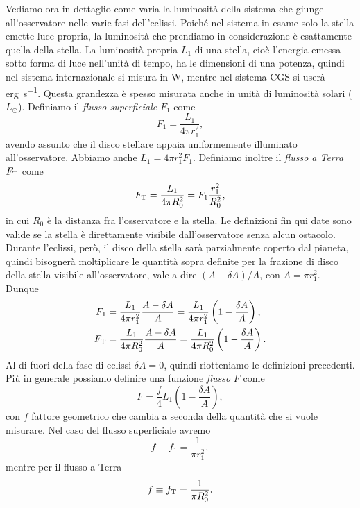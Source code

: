 Vediamo ora in dettaglio come varia la luminosità della sistema che giunge
all'osservatore nelle varie fasi dell'eclissi. Poiché nel sistema in esame solo
la stella emette luce propria, la luminosità che prendiamo in considerazione è
esattamente quella della stella. La luminosità propria $L_1$ di una stella,
cioè l'energia emessa sotto forma di luce nell'unità di tempo, ha le dimensioni
di una potenza, quindi nel sistema internazionale si misura in \si{\watt},
mentre nel sistema CGS si userà \si{erg\per \second}. Questa grandezza è spesso
misurata anche in unità di luminosità solari ($L_\odot$). Definiamo il
\emph{flusso superficiale} $F_1$ come
\begin{equation}
    F_1 = \frac{L_1}{4\pi r_1^2},
\end{equation}
avendo assunto che il disco stellare appaia uniformemente illuminato
all'osservatore. Abbiamo anche $L_1 = 4\pi r_1^2 F_1$. Definiamo
inoltre il \emph{flusso a Terra} $F_{\textup{T}}$ come
\begin{equation}
  F_{\textup{T}} = \frac{L_1}{4\pi R_0^2} = F_1 \frac{r_1^2}{R_0^2},
\end{equation}
in cui $R_0$ è la distanza fra l'osservatore e la stella. Le definizioni fin qui
date sono valide se la stella è direttamente visibile dall'osservatore senza
alcun ostacolo. Durante l'eclissi, però, il disco della stella sarà parzialmente
coperto dal pianeta, quindi bisognerà moltiplicare le quantità sopra definite
per la frazione di disco della stella visibile all'osservatore, vale a dire
$(A - \delta A)/A$, con $A= \pi r_1^2$. Dunque
\begin{align}
  F_1 &= \frac{L_1}{4\pi r_1^2} \frac{A - \delta A}{A} =
  \frac{L_1}{4\pi r_1^2} \left( 1 - \frac{\delta A}{A} \right), \\
  F_{\textup{T}} &= \frac{L_1}{4\pi R_0^2} \frac{A - \delta A}{A} =
  \frac{L_1}{4\pi R_0^2} \left( 1 - \frac{\delta A}{A} \right).
\end{align}
Al di fuori della fase di eclissi $\delta A = 0$, quindi riotteniamo le
definizioni precedenti. Più in generale possiamo definire una funzione
\emph{flusso} $F$ come
\begin{equation}
  F = \frac{f}{4} L_1 \left( 1 - \frac{\delta A}{A} \right),
\end{equation}
con $f$ fattore geometrico che cambia a seconda della quantità che si vuole
misurare. Nel caso del flusso superficiale avremo
\begin{equation}
  f \equiv f_1 = \frac{1}{\pi r_1^2},
\end{equation}
mentre per il flusso a Terra
\begin{equation}
  f \equiv f_{\textup{T}} = \frac{1}{\pi R_0^2}.
\end{equation}

